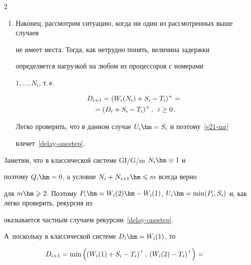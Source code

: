 \begin{multicols}{2}
\begin{enumerate}[1.]
\begin{multline*}

\left\{W_i(N_{i+1})>W_i(N_i)+S_i\right\}\cap\\

\cap

\left\{W_i(N_i+N_{i+1})<W_i(N_i)+S_i\right\}=\varnothing\,.

\end{multline*}

\item

Наконец, рассмотрим ситуацию, когда ни один из рассмотренных выше случаев

не имеет места. Тогда, как нетрудно понять, величина задержки

определяется нагрузкой на любом из процессоров с номерами

$1,\ldots,N_{i}$, т.\,е.\

\begin{multline}

D_{i+1}=(W_{i}(N_{i})+S_{i}-T_{i})^{+}={}\\

{}=(D_{i}+S_{i}-T_{i})^{+}\,,\enskip i\ge0\,.

\label{e21-mr}

\end{multline}

Легко проверить, что в данном случае  $U_{i}\hm=S_{i}$  и поэтому~\eqref{e21-mr} 

влечет~\eqref{delay-onestep}.

\end{enumerate}



\smallskip



Заметим, что в  классической системе GI/G/m $N_{i}\hm\equiv 1$ и

поэтому $Q_i\hm=0$, а условие $N_{i}+N_{i+1}\hm\leqslant m$ всегда верно

для $m\hm\geqslant 2$. Поэтому $P_{i}\hm=W_{i}(2)\hm-W_{i}(1)$,  $U_{i}\hm=\min

(P_{i},S_{i})$ и, как легко проверить,  рекурсия из~\cite{scheller-sigman97}  

оказывается частным случаем рекурсии~\eqref{delay-onestep}.  

А~поскольку в классической сис\-те\-ме $D_i\hm=W_{i}(1)$, то

\begin{multline*}

\hspace*{-9.687pt}D_{i+1}=\min\left(\left(W_{i}(1)+S_{i}-T_{i}\right)^{+},\,\left(W_{i}(2)-T_{i}\right)^{+}\right)={}\\


\end{multline*}
\end{multicols}
